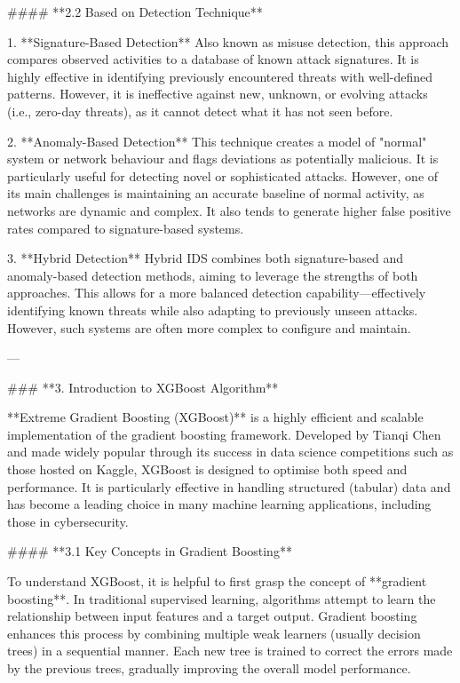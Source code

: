 #### **2.2 Based on Detection Technique**

1. **Signature-Based Detection**
   Also known as misuse detection, this approach compares observed activities to a database of known attack signatures. It is highly effective in identifying previously encountered threats with well-defined patterns. However, it is ineffective against new, unknown, or evolving attacks (i.e., zero-day threats), as it cannot detect what it has not seen before.

2. **Anomaly-Based Detection**
   This technique creates a model of "normal" system or network behaviour and flags deviations as potentially malicious. It is particularly useful for detecting novel or sophisticated attacks. However, one of its main challenges is maintaining an accurate baseline of normal activity, as networks are dynamic and complex. It also tends to generate higher false positive rates compared to signature-based systems.

3. **Hybrid Detection**
   Hybrid IDS combines both signature-based and anomaly-based detection methods, aiming to leverage the strengths of both approaches. This allows for a more balanced detection capability—effectively identifying known threats while also adapting to previously unseen attacks. However, such systems are often more complex to configure and maintain.

---

### **3. Introduction to XGBoost Algorithm**

**Extreme Gradient Boosting (XGBoost)** is a highly efficient and scalable implementation of the gradient boosting framework. Developed by Tianqi Chen and made widely popular through its success in data science competitions such as those hosted on Kaggle, XGBoost is designed to optimise both speed and performance. It is particularly effective in handling structured (tabular) data and has become a leading choice in many machine learning applications, including those in cybersecurity.

#### **3.1 Key Concepts in Gradient Boosting**

To understand XGBoost, it is helpful to first grasp the concept of **gradient boosting**. In traditional supervised learning, algorithms attempt to learn the relationship between input features and a target output. Gradient boosting enhances this process by combining multiple weak learners (usually decision trees) in a sequential manner. Each new tree is trained to correct the errors made by the previous trees, gradually improving the overall model performance.

